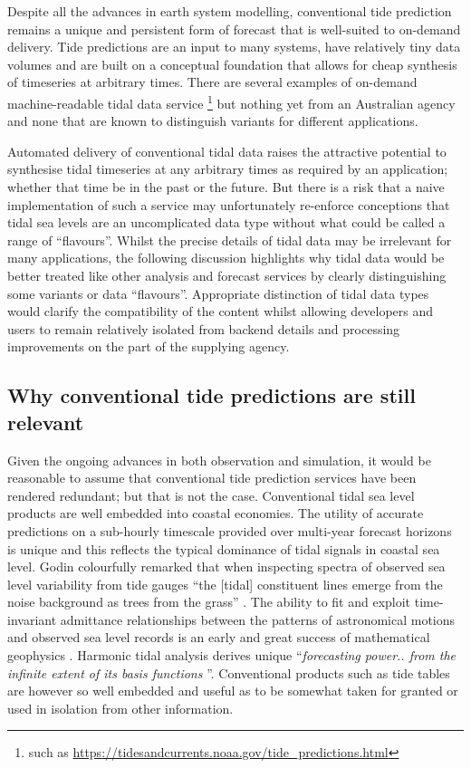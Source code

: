Despite all the advances in earth system modelling, conventional tide prediction remains a unique and persistent form of forecast that is well-suited to on-demand delivery.  Tide predictions are an input to many systems, have relatively tiny data volumes and are built on a conceptual foundation that allows for cheap synthesis of timeseries at arbitrary times.    There are several examples of on-demand machine-readable tidal data service \footnote{such as  \url{https://tidesandcurrents.noaa.gov/tide_predictions.html}} but nothing yet from an Australian agency and none that are known to distinguish variants for different applications.


Automated delivery of conventional tidal data raises the attractive potential to synthesise tidal timeseries at any arbitrary times as required by an application; whether that time be in the past or the future.   But there is a risk that a naive implementation of such a service may unfortunately re-enforce conceptions that tidal sea levels are an uncomplicated data type without what could be called a range of ``flavours''.
Whilst the precise details of tidal data may be irrelevant for many applications, the following discussion highlights why tidal data would be better treated like other analysis and forecast services by clearly distinguishing some variants or data ``flavours''. 
Appropriate distinction of tidal data types would clarify the compatibility of the content whilst allowing developers and users to remain relatively isolated from backend details and processing improvements on the part of the supplying agency.

\subsection{Why conventional tide predictions are still relevant}
Given the ongoing advances in both observation and simulation, it would be reasonable to assume that conventional tide prediction services have been rendered redundant; but that is not the case. 
Conventional tidal sea level products are well embedded into coastal economies.   The utility of accurate predictions on a sub-hourly timescale provided over multi-year forecast horizons is unique and this reflects the typical dominance of tidal signals in coastal sea level.
Godin colourfully remarked that when inspecting spectra of observed sea level variability from tide gauges ``the [tidal] constituent lines emerge from the noise background as trees from the grass'' \citep{godin:1972}.
The ability to fit and exploit time-invariant admittance relationships between the patterns of astronomical motions and observed sea level records is an early and great success of mathematical geophysics \citep{Cartwright:2000tt}.  Harmonic tidal analysis derives unique ``\textit{forecasting power.. from the infinite extent of its basis functions} ''\citep{Flinchem:2000kp}.
Conventional products such as tide tables are however so well embedded and useful as to be somewhat taken for granted or used in isolation from other information. 

